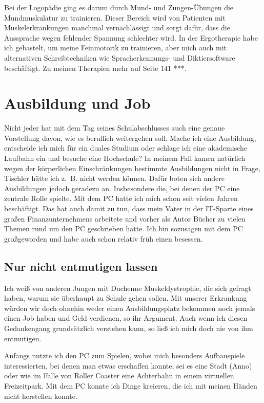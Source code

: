 \documentclass[fontsize=14pt,a4paper,headinclude,DIV=calc,automark]{scrbook}
\begin{document}
Bei der Logopädie ging es darum durch Mund- und Zungen-Übungen die Mundmuskulatur zu trainieren. Dieser Bereich wird von Patienten mit Muskelerkrankungen manchmal vernachlässigt und sorgt dafür, dass die Aussprache wegen fehlender Spannung schlechter wird. In der Ergotherapie habe ich gebastelt, um meine Feinmotorik zu trainieren, aber mich auch mit alternativen Schreibtechniken wie Spracherkennungs- und Diktiersoftware beschäftigt. Zu meinen Therapien mehr auf Seite 141 ***.

\section{Ausbildung und Job}

Nicht jeder hat mit dem Tag seines Schulabschlusses auch eine genaue Vorstellung davon, wie es beruflich weitergehen soll. Mache ich eine Ausbildung, entscheide ich mich für ein duales Studium oder schlage ich eine akademische Laufbahn ein und besuche eine Hochschule? In meinem Fall kamen natürlich wegen der körperlichen Einschränkungen bestimmte Ausbildungen nicht in Frage, Tischler hätte ich z. B. nicht werden können. Dafür boten sich andere Ausbildungen jedoch geradezu an. Insbesondere die, bei denen der PC eine zentrale Rolle spielte. Mit dem PC hatte ich mich schon seit vielen Jahren beschäftigt. Das hat auch damit zu tun, dass mein Vater in der IT-Sparte eines großen Finanzunternehmens arbeitete und vorher als Autor Bücher zu vielen Themen rund um den PC geschrieben hatte. Ich bin sozusagen mit dem PC großgeworden und habe auch schon relativ früh einen besessen.

\subsection{Nur nicht entmutigen lassen}

Ich weiß von anderen Jungen mit Duchenne Muskeldystrophie, die sich gefragt haben, warum sie überhaupt zu Schule gehen sollen. Mit unserer Erkrankung würden wir doch ohnehin weder einen Ausbildungsplatz bekommen noch jemals einen Job haben und Geld verdienen, so ihr Argument. Auch wenn ich diesen Gedankengang grundsätzlich verstehen kann, so ließ ich mich doch nie von ihm entmutigen.

Anfangs nutzte ich den PC zum Spielen, wobei mich besonders Aufbauspiele interessierten, bei denen man etwas erschaffen konnte, sei es eine Stadt (Anno) oder wie im Falle von Roller Coaster eine Achterbahn in einem virtuellen Freizeitpark. Mit dem PC konnte ich Dinge kreieren, die ich mit meinen Händen nicht herstellen konnte.
\end{document}
